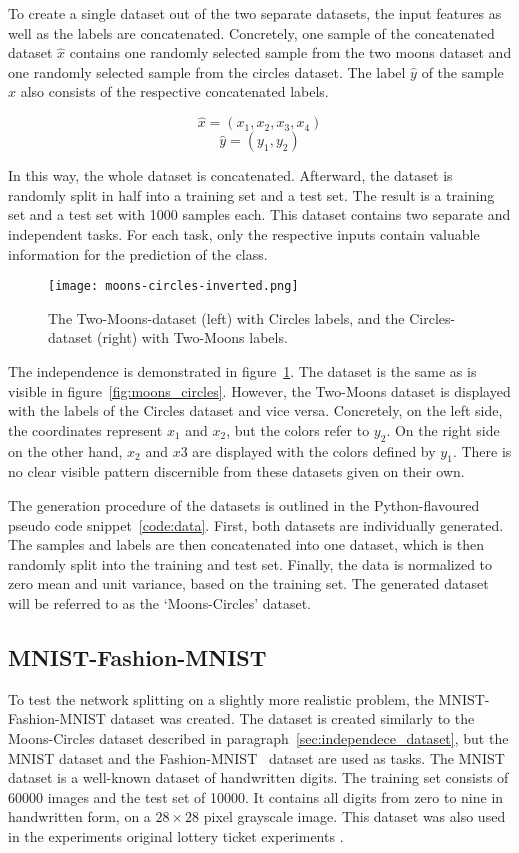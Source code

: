 To create a single dataset out of the two separate datasets, the input features as well as the labels are concatenated.
Concretely, one sample of the concatenated dataset $\hat x$ contains one randomly selected sample from the two moons dataset and one randomly selected sample from the circles dataset.
The label $\hat y$ of the sample $\hat x$ also consists of the respective concatenated labels.

\[\hat x = ( x_1 , x_2 , x_3 , x_4 )\]
\[\hat y = ( y_1 , y_2 )\]

In this way, the whole dataset is concatenated.
Afterward, the dataset is randomly split in half into a training set and a test set.
The result is a training set and a test set with 1000 samples each.
This dataset contains two separate and independent tasks.
For each task, only the respective inputs contain valuable information for the prediction of the class.

\begin{figure}[ht]
    \centering\texttt{[image: moons-circles-inverted.png]}
    \caption[Two-Moons and Circles Dataset, inverted labels]{
        The Two-Moons-dataset (left) with Circles labels, and the Circles-dataset (right) with Two-Moons labels. 
    }\label{fig:moons_circles_inverted}
\end{figure}

The independence is demonstrated in figure~\ref{fig:moons_circles_inverted}.
The dataset is the same as is visible in figure~\ref{fig:moons_circles}. 
However, the Two-Moons dataset is displayed with the labels of the Circles dataset and vice versa.
Concretely, on the left side, the coordinates represent $x_1$ and $x_2$, but the colors refer to $y_2$.
On the right side on the other hand, $x_2$ and $x3$ are displayed with the colors defined by $y_1$.
There is no clear visible pattern discernible from these datasets given on their own.

The generation procedure of the datasets is outlined in the Python-flavoured pseudo code snippet~\ref{code:data}.
First, both datasets are individually generated.
The samples and labels are then concatenated into one dataset, which is then randomly split into the training and test set.
Finally, the data is normalized to zero mean and unit variance, based on the training set.
The generated dataset will be referred to as the `Moons-Circles' dataset.

\subsection{MNIST-Fashion-MNIST}\label{sec:mnist}
To test the network splitting on a slightly more realistic problem, the MNIST-Fashion-MNIST dataset was created.
The dataset is created similarly to the Moons-Circles dataset described in paragraph~\ref{sec:independece_dataset}, but the MNIST dataset \autocite{mnist} and the Fashion-MNIST~\autocite{fashion} dataset are used as tasks.
The MNIST dataset is a well-known dataset of handwritten digits. 
The training set consists of 60000 images and the test set of 10000.
It contains all digits from zero to nine in handwritten form, on a $28 \times 28$ pixel grayscale image.
This dataset was also used in the experiments original lottery ticket experiments \autocite{LTH}.

